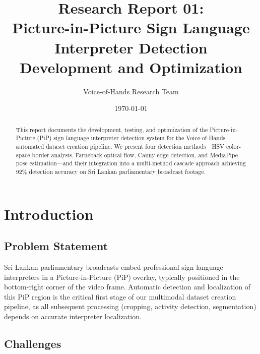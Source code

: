 \documentclass[11pt,a4paper]{article}
\title{\textbf{Research Report 01:}\\Picture-in-Picture Sign Language Interpreter Detection\\Development and Optimization}
\author{Voice-of-Hands Research Team}
\date{\today}
\begin{document}
\maketitle

\begin{abstract}
This report documents the development, testing, and optimization of the Picture-in-Picture (PiP) sign language interpreter detection system for the Voice-of-Hands automated dataset creation pipeline. We present four detection methods---HSV color-space border analysis, Farneback optical flow, Canny edge detection, and MediaPipe pose estimation---and their integration into a multi-method cascade approach achieving 92\% detection accuracy on Sri Lankan parliamentary broadcast footage.
\end{abstract}

\tableofcontents
\newpage

\section{Introduction}

\subsection{Problem Statement}

Sri Lankan parliamentary broadcasts embed professional sign language interpreters in a Picture-in-Picture (PiP) overlay, typically positioned in the bottom-right corner of the video frame. Automatic detection and localization of this PiP region is the critical first stage of our multimodal dataset creation pipeline, as all subsequent processing (cropping, activity detection, segmentation) depends on accurate interpreter localization.

\subsection{Challenges}
\end{document}
